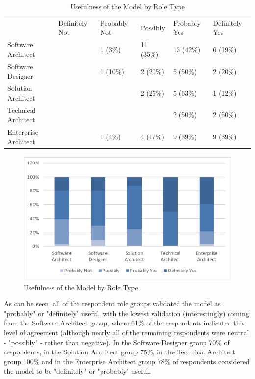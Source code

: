 \begin{table}
\caption{Usefulness of the Model by Role Type}
\label{table:usefulnessbyrole}
\footnotesize
\begin{tabular}{l p{1.5cm} p{1.5cm} p{1.5cm} p{1.5cm} p{1.5cm}}
 & Definitely Not & Probably Not & Possibly & Probably Yes & Definitely Yes \\
Software Architect	 &  &  1 (3\%)  & 11 (35\%) & 13 (42\%) & 6 (19\%) \\
Software Designer    &  &  1 (10\%) & 2 (20\%)  & 5 (50\%)	& 2 (20\%) \\
Solution Architect   &  &           & 2 (25\%)  & 5 (63\%)  & 1 (12\%) \\
Technical Architect	 &  &           &           & 2 (50\%)  & 2 (50\%) \\
Enterprise Architect &  & 1 (4\%)   & 4 (17\%)  & 9 (39\%)  & 9 (39\%) \\
\end{tabular}
\end{table}

\begin{figure}
\centering
\includegraphics[width=12cm]{Figures/prioritisation-usefulness-by-role}
\caption{Usefulness of the Model by Role Type}
\label{figure:usefulnessbyrole}
\end{figure}

As can be seen, all of the respondent role groups validated the model as "probably" or "definitely" useful, with the lowest validation (interestingly) coming from the Software Architect group, where 61\% of the respondents indicated this level of agreement (although nearly all of the remaining respondents were neutral - "possibly" - rather than negative).  In the Software Designer group 70\% of respondents, in the Solution Architect group 75\%, in the Technical Architect group 100\% and in the Enterprise Architect group 78\% of respondents considered the model to be "definitely" or "probably" useful.

